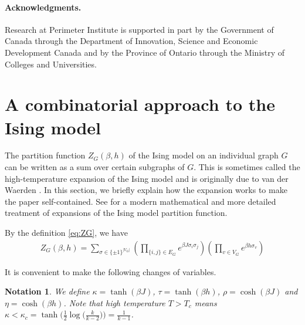 \documentclass{article}
\numberwithin{theorem}{section}
\newtheorem{notation}[theorem]{Notation}
\theoremstyle{remark}
\begin{document}
\paragraph{Acknowledgments.}
Research at Perimeter Institute is supported in part by the Government of Canada through the Department of Innovation, Science and Economic Development Canada and by the Province of Ontario through the Ministry of Colleges and Universities.

\section{A combinatorial approach to the Ising model}
\label{sec:combinatorics}

The partition function $Z_G(\beta,h)$ of the Ising model on an individual graph $G$ can be written as a sum over certain subgraphs of $G$. This is sometimes called the high-temperature expansion of the Ising model and is originally due to van der Waerden \cite{vanderWaerden1941}. In this section, we briefly explain how the expansion works to make the paper self-contained. See \cite{duminil2016random} for a modern mathematical and more detailed treatment of expansions of the Ising model partition function.\par

By the definition \eqref{eq:ZG}, we have 
\begin{align*}
  Z_G(\beta,h) = 
\sum_{\sigma\in \{\pm 1\}^{|V_G|}} 
\left(
\prod_{\{i, j\} \in E_G} e^{\beta J \sigma_i \sigma_j} \right) \left( \prod_{v \in V_G} e^{\beta h \sigma_{v}} \right)
\end{align*}

It is convenient to make the following changes of variables.

\begin{notation}
\label{not:variable_changes}
We define $\kappa = \tanh(\beta J)$, $\tau = \tanh(\beta h)$, $\rho = \cosh(\beta J)$ and $\eta = \cosh(\beta h)$. Note that high temperature $T > T_c$ means $\kappa < \kappa_c = \tanh\big(\tfrac{1}{2} \log \big(\tfrac{k}{k-2}\big)\big) = \tfrac{1}{k-1}$.
\end{notation}
\end{document}
